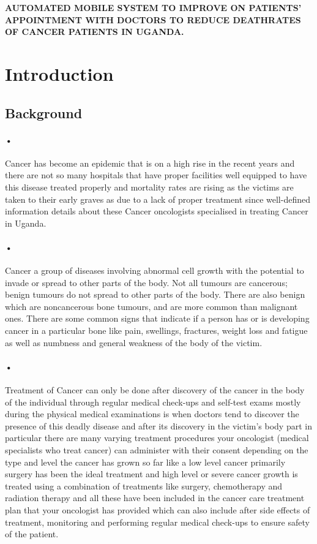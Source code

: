 \documentclass[12pt]{article}
\begin{document}
\newpage
\title{}\textbf{AUTOMATED MOBILE SYSTEM TO IMPROVE ON PATIENTS’ APPOINTMENT WITH DOCTORS TO REDUCE DEATHRATES OF CANCER PATIENTS IN UGANDA.
} 


\section{Introduction}
\subsection{Background}

\paragraph{•}Cancer has become an epidemic that is on a high rise in the recent years and there are not so many hospitals that have proper facilities well equipped to have this disease treated properly and mortality rates are rising as the victims are taken to their early graves as due to a lack of proper treatment since well-defined information details about these Cancer oncologists specialised in treating Cancer in Uganda.

\paragraph{•}Cancer a group of diseases involving abnormal cell growth with the potential to invade or spread to other parts of the body. Not all tumours are cancerous; benign tumours do not spread to other parts of the body. There are also benign which are noncancerous bone tumours, and are more common than malignant ones. There are some common signs that indicate if a person has or is developing cancer in a particular bone like pain, swellings, fractures, weight loss and fatigue as well as numbness and general weakness of the body of the victim. 

\paragraph{•}Treatment of Cancer can only be done after discovery of the cancer in the body of the individual through regular medical check-ups and self-test exams mostly during the physical medical examinations is when doctors tend to discover the presence of this deadly disease and after its discovery in the victim’s body part in particular there are many varying treatment procedures your oncologist (medical specialists who treat cancer) can administer with their consent  depending on the type and level the cancer has grown so far like a low level cancer primarily surgery has been the ideal treatment and high level or severe cancer growth is treated using a combination of treatments like surgery, chemotherapy and radiation therapy and all these have been included in the cancer care treatment plan that your oncologist has provided which can also include after side effects of treatment, monitoring and performing regular medical check-ups to ensure safety of the patient.
\end{document}

